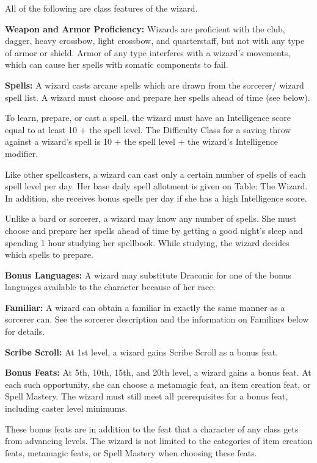 \ClassFeatures

All of the following are class features of the wizard.

\textbf{Weapon and Armor Proficiency:} Wizards are proficient with the club, dagger, 
heavy crossbow, light crossbow, and quarterstaff, but not with any type of armor 
or shield. Armor of any type interferes with a wizard's movements, which can cause 
her spells with somatic components to fail.

\textbf{Spells:} A wizard casts arcane spells which are drawn from the sorcerer/ 
wizard spell list. A wizard must choose and prepare her spells ahead of time (see 
below).

To learn, prepare, or cast a spell, the wizard must have an Intelligence score 
equal to at least 10 + the spell level. The Difficulty Class for a saving throw 
against a wizard's spell is 10 + the spell level + the wizard's Intelligence modifier.

Like other spellcasters, a wizard can cast only a certain number of spells of each 
spell level per day. Her base daily spell allotment is given on Table: The Wizard. 
In addition, she receives bonus spells per day if she has a high Intelligence score.

Unlike a bard or sorcerer, a wizard may know any number of spells. She must choose 
and prepare her spells ahead of time by getting a good night's sleep and spending 
1 hour studying her spellbook. While studying, the wizard decides which spells 
to prepare.

\textbf{Bonus Languages:} A wizard may substitute Draconic for one of the bonus 
languages available to the character because of her race.

\textbf{Familiar:} A wizard can obtain a familiar in exactly the same manner as 
a sorcerer can. See the sorcerer description and the information on Familiars below 
for details.

\textbf{Scribe Scroll:} At 1st level, a wizard gains Scribe Scroll as a bonus feat. 

\textbf{Bonus Feats:} At 5th, 10th, 15th, and 20th level, a wizard gains a bonus 
feat. At each such opportunity, she can choose a metamagic feat, an item creation 
feat, or Spell Mastery. The wizard must still meet all prerequisites for a bonus 
feat, including caster level minimums.

These bonus feats are in addition to the feat that a character of any class gets 
from advancing levels. The wizard is not limited to the categories of item creation 
feats, metamagic feats, or Spell Mastery when choosing these feats.

